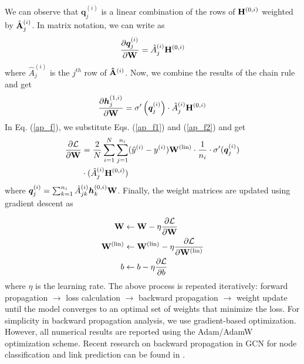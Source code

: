 \documentclass[aps, prd, showpacs, floatfix, superscriptaddress, twocolumn, nofootinbib, preprintnumbers, longbibliography]{revtex4-2}
\begin{document}
We can observe that \(\bm{q}^{(i)}_j\) is a linear combination of the rows of \({\bf H}^{(0,i)}\) weighted by \(\hat{\bf A}^{(i)}_j\). In matrix notation, we can write as
\begin{equation}\nonumber
\frac{\partial \bm{q}^{(i)}_j}{\partial {\bf W}} = \hat{A}^{(i)}_j {\bf H}^{(0,i)}
\end{equation}
where $\hat{A}^{(i)}_j$ is the $j^{th}$ row of ${\bf \hat{A}}^{(i)}$. Now, we combine the results of the chain rule and get
\begin{equation}\label{ap_f2}
\frac{\partial \bm{h}^{(1,i)}_j}{\partial {\bf W}} = \sigma'\left(\bm{q}^{(i)}_j\right) \cdot \hat{A}^{(i)}_j {\bf H}^{(0,i)}
\end{equation}
In Eq. (\ref{ap_f}), we substitute Eqs. (\ref{ap_f1}) and (\ref{ap_f2}) and get
\begin{equation}
\begin{split}
\frac{\partial \mathcal{L}}{\partial {\bf W}} &= \frac{2}{N} \sum_{i=1}^N \sum_{j=1}^{n_i}  (\hat{y}^{(i)} - y^{(i)}) {\bf W}^{(\text{lin})}\cdot \frac{1}{n_i} \cdot \sigma'(\bm{q}^{(i)}_j)\\
&\cdot (\hat{A}^{(i)}_j {\bf H}^{(0,i)})
\end{split}
\end{equation}
where $\bm{q}^{(i)}_j = \sum_{k=1}^{n_i} \hat{A}^{(i)}_{jk} \bm{h}^{(0,i)}_k {\bf W}$. Finally, the weight matrices are updated using gradient descent as

\begin{equation}
\begin{split}
{\bf W} &\leftarrow {\bf W} - \eta \frac{\partial \mathcal{L}}{\partial {\bf W}} \\
{\bf W}^{(\text{lin})} &\leftarrow {\bf W}^{(\text{lin})} - \eta \frac{\partial \mathcal{L}}{\partial {\bf W}^{(\text{lin})}}\\
b & \leftarrow b - \eta \frac{\partial \mathcal{L}}{\partial b}
\end{split}
\end{equation}
where $\eta$ is the learning rate. The above process is repeated iteratively: forward propagation $\rightarrow$ loss calculation $\rightarrow$ backward propagation $\rightarrow$ weight update until the model converges to an optimal set of weights that minimize the loss. For simplicity in backward propagation analysis, we use gradient-based optimization. However, all numerical results are reported using the Adam/AdamW optimization scheme. Recent research on backward propagation in GCN for node classification and link prediction can be found in \cite{hsiao2024derivation}.
\end{document}
